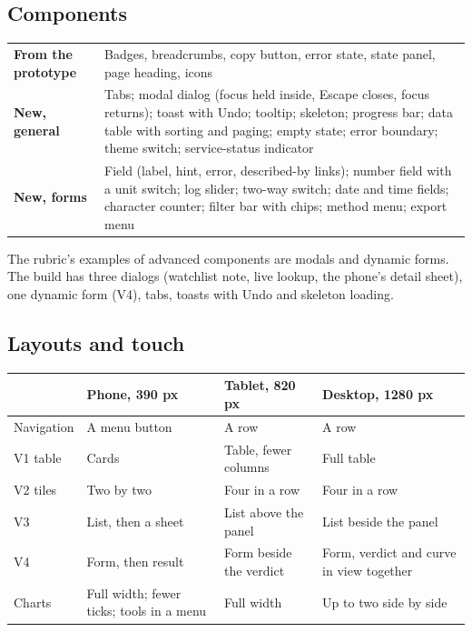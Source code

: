 \subsection{Components}
\label{sec:components}

\begin{center}
\small
\begin{tabularx}{\textwidth}{@{}L{3.3cm}Y@{}}
\toprule
\textbf{From the prototype} & Badges, breadcrumbs, copy button, error state, state panel, page heading, icons \\
\textbf{New, general} & Tabs; modal dialog (focus held inside, Escape closes, focus returns); toast with Undo; tooltip; skeleton; progress bar; data table with sorting and paging; empty state; error boundary; theme switch; service-status indicator \\
\textbf{New, forms} & Field (label, hint, error, described-by links); number field with a unit switch; log slider; two-way switch; date and time fields; character counter; filter bar with chips; method menu; export menu \\
\bottomrule
\end{tabularx}
\end{center}

The rubric's examples of advanced components are modals and dynamic forms. The build has three
dialogs (watchlist note, live lookup, the phone's detail sheet), one dynamic form (V4), tabs, toasts
with Undo and skeleton loading.

\subsection{Layouts and touch}
\label{sec:responsive}

\begin{center}
\small
\begin{tabularx}{\textwidth}{@{}L{2.3cm}Y Y Y@{}}
\toprule
 & \textbf{Phone, 390 px} & \textbf{Tablet, 820 px} & \textbf{Desktop, 1280 px} \\
\midrule
Navigation & A menu button & A row & A row \\
V1 table & Cards & Table, fewer columns & Full table \\
V2 tiles & Two by two & Four in a row & Four in a row \\
V3 & List, then a sheet & List above the panel & List beside the panel \\
V4 & Form, then result & Form beside the verdict & Form, verdict and curve in view together \\
Charts & Full width; fewer ticks; tools in a menu & Full width & Up to two side by side \\
\bottomrule
\end{tabularx}
\end{center}

